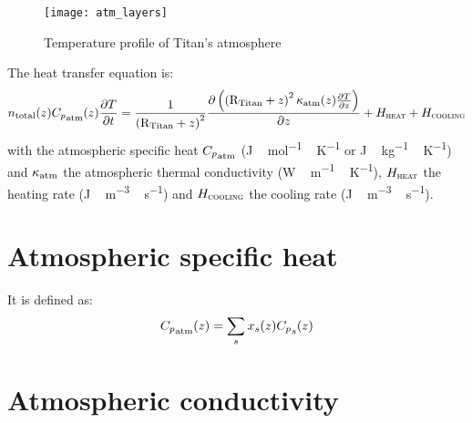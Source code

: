 \begin{figure}
\centering
\texttt{[image: atm\_layers]}
\caption{\label{T(z):Titan}Temperature profile of Titan's atmosphere}
\end{figure}


The heat transfer equation is:
\begin{equation}
n_\text{total}(z){C_p}_{\text{atm}}(z)\frac{\partial T}{\partial t} 
                                     = \frac{1}{\left(\text{R}_\text{Titan} + z\right)^2} 
                                       \frac{\partial\left(\left(\text{R}_\text{Titan} + z\right)^2
                                               \kappa_\text{atm}(z)\frac{\partial T}{\partial z}\right)
                                              }{\partial z}
                                        + H_{\text{\sc heat}}
                                        + H_{\text{\sc cooling}}
\label{Titan:temp}
\end{equation}
with the atmospheric specific heat ${C_p}_\text{atm}$ (\unit{J\,mol^{-1}\,K^{-1}} or \unit{J\,kg^{-1}\,K^{-1}}) and
$\kappa_\text{atm}$ the atmospheric thermal conductivity (\unit{W\,m^{-1}\,K^{-1}}),
$H_{\text{\sc heat}}$ the heating rate (\unit{J\,m^{-3}\,s^{-1}}) and
$H_{\text{\sc cooling}}$ the cooling rate (\unit{J\,m^{-3}\,s^{-1}}).

\section{Atmospheric specific heat}
It is defined as:
\begin{equation}
{C_p}_{\text{atm}}(z) = \sum_s x_s(z){C_p}_s(z)
\label{Titan:spec_heat}
\end{equation}

\section{Atmospheric conductivity}

